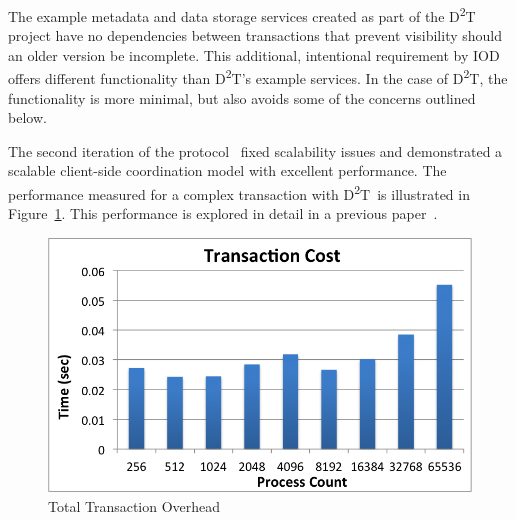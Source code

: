 \documentclass[conference]{IEEEtran}
\newcommand{\DDT}{D\textsuperscript{2}T~}
\newcommand{\DDTns}{D\textsuperscript{2}T}
\begin{document}
The example metadata and data storage services created as part of the \DDT
project have no dependencies between transactions that prevent visibility
should an older version be incomplete. This additional, intentional requirement
by IOD offers different functionality than \DDTns's example services. In the
case of \DDTns, the functionality is more minimal, but also avoids some of the
concerns outlined below.

The second iteration of the protocol~\cite{lofstead:2013:pdsw-txn} fixed
scalability issues and demonstrated a scalable client-side coordination model
with excellent performance. The performance measured for a complex transaction
with \DDT is illustrated in Figure~\ref{fig:performance}. This performance is
explored in detail in a previous paper~\cite{lofstead:2013:pdsw-txn}.

\begin{figure}[ht]
\centering
\includegraphics[keepaspectratio=true, width=0.9\columnwidth]{images/performance}
\vspace{-0.15in}
\caption{Total Transaction Overhead}
\label{fig:performance}
\end{figure}
\end{document}
